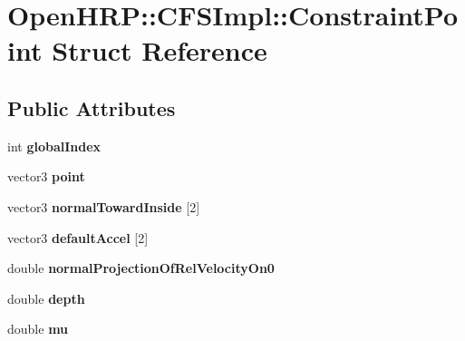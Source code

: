 \hypertarget{structOpenHRP_1_1CFSImpl_1_1ConstraintPoint}{\section{Open\-H\-R\-P\-:\-:C\-F\-S\-Impl\-:\-:Constraint\-Point Struct Reference}
\label{structOpenHRP_1_1CFSImpl_1_1ConstraintPoint}
}
\subsection*{Public Attributes}
\begin{DoxyCompactItemize}
\item 
\hypertarget{structOpenHRP_1_1CFSImpl_1_1ConstraintPoint_a53086001ac9adc136ca4793c820e2cae}{int {\bfseries global\-Index}}\label{structOpenHRP_1_1CFSImpl_1_1ConstraintPoint_a53086001ac9adc136ca4793c820e2cae}

\item 
\hypertarget{structOpenHRP_1_1CFSImpl_1_1ConstraintPoint_a9e329cffdd5893c84929d70962821966}{vector3 {\bfseries point}}\label{structOpenHRP_1_1CFSImpl_1_1ConstraintPoint_a9e329cffdd5893c84929d70962821966}

\item 
\hypertarget{structOpenHRP_1_1CFSImpl_1_1ConstraintPoint_a4cc2b953d7054a68f8d924f322b67f8d}{vector3 {\bfseries normal\-Toward\-Inside} \mbox{[}2\mbox{]}}\label{structOpenHRP_1_1CFSImpl_1_1ConstraintPoint_a4cc2b953d7054a68f8d924f322b67f8d}

\item 
\hypertarget{structOpenHRP_1_1CFSImpl_1_1ConstraintPoint_a5dc3e91e8778c490bae1256568413eb8}{vector3 {\bfseries default\-Accel} \mbox{[}2\mbox{]}}\label{structOpenHRP_1_1CFSImpl_1_1ConstraintPoint_a5dc3e91e8778c490bae1256568413eb8}

\item 
\hypertarget{structOpenHRP_1_1CFSImpl_1_1ConstraintPoint_afe3cf897bfe4457e7a29a24e82b59abc}{double {\bfseries normal\-Projection\-Of\-Rel\-Velocity\-On0}}\label{structOpenHRP_1_1CFSImpl_1_1ConstraintPoint_afe3cf897bfe4457e7a29a24e82b59abc}

\item 
\hypertarget{structOpenHRP_1_1CFSImpl_1_1ConstraintPoint_a5b210d98c6461861ffdf161c228d34c9}{double {\bfseries depth}}\label{structOpenHRP_1_1CFSImpl_1_1ConstraintPoint_a5b210d98c6461861ffdf161c228d34c9}

\item 
\hypertarget{structOpenHRP_1_1CFSImpl_1_1ConstraintPoint_ab4719c11ac88af6eb3d4890856505016}{double {\bfseries mu}}\label{structOpenHRP_1_1CFSImpl_1_1ConstraintPoint_ab4719c11ac88af6eb3d4890856505016}


\end{DoxyCompactItemize}
